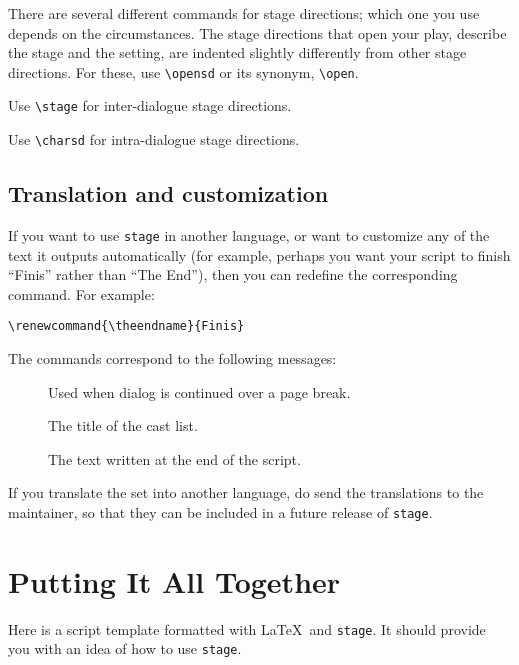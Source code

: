 \documentclass{report}
\begin{document}
There are several different commands for stage directions; which one you use depends on the circumstances. The stage directions that open your play, describe the stage and the setting, are indented slightly differently from other stage directions. For these, use \verb|\opensd| or its synonym, \verb|\open|.

Use \verb|\stage| for inter-dialogue stage directions.

Use \verb|\charsd| for intra-dialogue stage directions.

\section{Translation and customization}

If you want to use \texttt{stage} in another language, or want to customize any of the text it outputs automatically (for example, perhaps you want your script to finish “Finis” rather than “The End”), then you can redefine the corresponding command. For example:

\begin{verbatim}
\renewcommand{\theendname}{Finis}
\end{verbatim}

The commands correspond to the following messages:

\begin{description}
  \item[\Q{\\continuedname}]Used when dialog is continued over a page break.
  \item[\Q{\\castname}]The title of the cast list.
  \item[\Q{\\theendname}]The text written at the end of the script.
\end{description}

If you translate the set into another language, do send the translations to the maintainer, so that they can be included in a future release of \texttt{stage}.


\chapter{Putting It All Together}

Here is a script template formatted with \LaTeX\ and \texttt{stage}. It should provide you with an idea of how to use \texttt{stage}.
\end{document}
